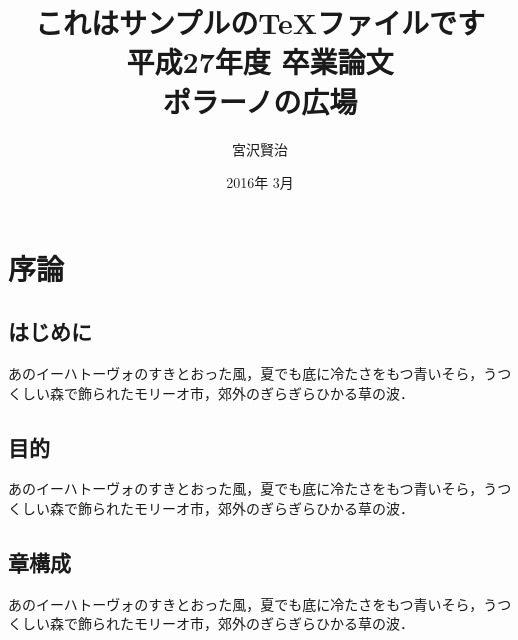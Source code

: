 \documentclass[uplatex,report]{jsbook}
\begin{document}
\title{これはサンプルのTeXファイルです\\
平成27年度 卒業論文\\
ポラーノの広場}
\author{宮沢賢治}
\date{2016年 3月}
\maketitle
\chapter{序論}
\section{はじめに}
あのイーハトーヴォのすきとおった風，夏でも底に冷たさをもつ青いそら，うつくしい森で飾られたモリーオ市，郊外のぎらぎらひかる草の波．
\section{目的}
あのイーハトーヴォのすきとおった風，夏でも底に冷たさをもつ青いそら，うつくしい森で飾られたモリーオ市，郊外のぎらぎらひかる草の波．
\section{章構成}
あのイーハトーヴォのすきとおった風，夏でも底に冷たさをもつ青いそら，うつくしい森で飾られたモリーオ市，郊外のぎらぎらひかる草の波．
\end{document}
